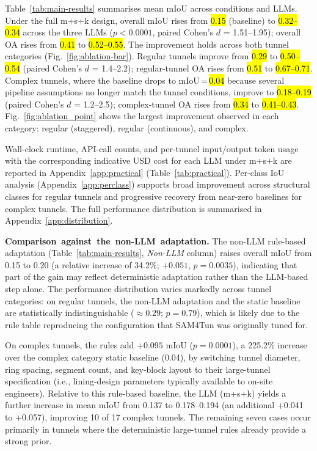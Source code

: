 \documentclass[a4paper,fleqn]{cas-dc}
\begin{document}
{Table~\ref{tab:main-results} summarises mean mIoU across conditions and LLMs. Under the full m+s+k design, overall mIoU rises from \hl{0.15} (baseline) to \hl{0.32--0.34} across the three LLMs ($p < 0.0001$, paired Cohen's \mbox{$d$} = 1.51--1.95); overall OA rises from \hl{0.41} to \hl{0.52--0.55}. The improvement holds across both tunnel categories (Fig.~\ref{fig:ablation-bar}). Regular tunnels improve from \hl{0.29} to \hl{0.50--0.54} (paired Cohen's \mbox{$d$} = 1.4--2.2); regular-tunnel OA rises from \hl{0.51} to \hl{0.67--0.71}. Complex tunnels, where the baseline drops to mIoU\,=\,\hl{0.04} because several pipeline assumptions no longer match the tunnel conditions, improve to \hl{0.18--0.19} (paired Cohen's \mbox{$d$} = 1.2--2.5); complex-tunnel OA rises from \hl{0.34} to \hl{0.41--0.43}. Fig.~\ref{fig:ablation_point} shows the largest improvement observed in each category: regular (staggered), regular (continuous), and complex.

Wall-clock runtime, API-call counts, and per-tunnel input/output token usage with the corresponding indicative USD cost for each LLM under m+s+k are reported in Appendix~\ref{app:practical} (Table~\ref{tab:practical}). Per-class IoU analysis (Appendix~\ref{app:perclass}) supports broad improvement across structural classes for regular tunnels and progressive recovery from near-zero baselines for complex tunnels. The full performance distribution is summarised in Appendix~\ref{app:distribution}. 



\mbox{\textbf{Comparison against the non-LLM adaptation.}} The non-LLM rule-based adaptation (Table~\mbox{\ref{tab:main-results}}, \mbox{\emph{Non-LLM}} column) raises overall mIoU from 0.15 to 0.20 (a relative increase of 34.2\%; $+0.051$, $p = 0.0035$), indicating that part of the gain may reflect deterministic adaptation rather than the LLM-based step alone. The performance distribution varies markedly across tunnel categories: on regular tunnels, the non-LLM adaptation and the static baseline are statistically indistinguishable ($\approx 0.29$; $p = 0.79$), which is likely due to the rule table reproducing the configuration that SAM4Tun was originally tuned for.

On complex tunnels, the rules add $+0.095$ mIoU ($p = 0.0001$), a 225.2\% increase over the complex category static baseline (0.04), by switching tunnel diameter, ring spacing, segment count, and key-block layout to their large-tunnel specification (i.e., lining-design parameters typically available to on-site engineers). Relative to this rule-based baseline, the LLM (m+s+k) yields a further increase in mean mIoU from 0.137 to 0.178--0.194 (an additional +0.041 to +0.057), improving 10 of 17 complex tunnels. The remaining seven cases occur primarily in tunnels where the deterministic large-tunnel rules already provide a strong prior.

}
\end{document}
